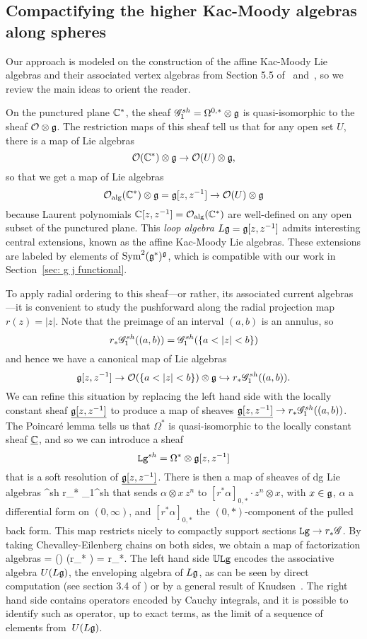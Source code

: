 \subsection{Compactifying the higher Kac-Moody algebras along spheres}

Our approach is modeled on the construction of the affine Kac-Moody Lie algebras and their associated vertex algebras from Section 5.5 of~\cite{CG1} and~\cite{OGthesis},
so we review the main ideas to orient the reader.

On the punctured plane $\mathbb C^*$, the sheaf $
\mathscr G_1^{sh} = \Omega^{0,*} \otimes \mathfrak g$ is quasi-isomorphic to the sheaf $\mathcal O \otimes \mathfrak g$.
The restriction maps of this sheaf tell us that for any open set $U$, there is a map of Lie algebras
\[
\mathcal O(\mathbb C^*) \otimes \mathfrak g \to \mathcal O(U) \otimes \mathfrak g,
\]
so that we get a map of Lie algebras
\[
\mathcal O_{\rm alg}(\mathbb C^*) \otimes \mathfrak g = \mathfrak g[z,z^{-1}] \to  \mathcal O(U) \otimes \mathfrak g
\]
because Laurent polynomials $\mathbb C[z,z^{-1}] = \mathcal O_{\rm alg}(\mathbb C^*)$ are well-defined on any open subset of the punctured plane.
This {\em loop algebra} $L\mathfrak g = \mathfrak g[z,z^{-1}]$ admits interesting central extensions,
known as the affine Kac-Moody Lie algebras.
These extensions are labeled by elements of ${\rm Sym}^2(\mathfrak g^*)^\mathfrak g$, 
which is compatible with our work in Section~\ref{sec: g j functional}.

To apply radial ordering to this sheaf---or rather, its associated current algebras---it is convenient to study the pushforward along the radial projection map $r(z) = |z|$.
Note that the preimage of an interval $(a,b)$ is an annulus, so
\[
r_* \mathscr G_1^{sh}((a,b)) = \mathscr G_1^{sh}(\{a < |z| < b\})
\]
and hence we have a canonical map of Lie algebras
\[
\mathfrak g[z,z^{-1}] \to \mathcal O(\{a < |z| < b\}) \otimes \mathfrak g \hookrightarrow r_* \mathscr G_1^{sh}((a,b)).
\]
We can refine this situation by replacing the left hand side with the locally constant sheaf $\underline{\mathfrak g[z,z^{-1}]}$ to produce a map of sheaves $\underline{\mathfrak g[z,z^{-1}]} \to  r_* \mathscr G_1^{sh}((a,b))$.
The Poincar\'e lemma tells us that $\Omega^*$ is quasi-isomorphic to the locally constant sheaf $\underline{\mathbb C}$,
and so we can introduce a sheaf
\[
\mathtt{Lg}^{sh} = \Omega^* \otimes \mathfrak g[z,z^{-1}]
\]
that is a soft resolution of $\underline{\mathfrak g[z,z^{-1}]}$.
There is then a map of sheaves of dg Lie algebras
\beqn
\label{eqn:looptolinearcurrent}
^{sh} \to r_* \sG_1^{sh}
\eeqn
that sends $\alpha \otimes x\, z^n$ to $[r^*\alpha]_{0,*} \cdot z^n \otimes x$, with $x \in \mathfrak g$, $\alpha$ a differential form on $(0,\infty)$, and $[r^*\alpha]_{0,*}$ the $(0,*)$-component of the pulled back form.
This map restricts nicely to compactly support sections $\mathtt{Lg} \to r_* \mathscr G$.
By taking Chevalley-Eilenberg chains on both sides, we obtain a map of factorization algebras
\beqn
\label{eqn:Uoflooptolinearcurrent}
\UU{} = \cliels() \to \cliels(r_* \sG) = r_*\UU\sG.
\eeqn
The left hand side $\mathbb U\mathtt{Lg}$ encodes the associative algebra $U(L\mathfrak g)$, the enveloping algebra of $L\mathfrak g$,
as can be seen by direct computation (see section 3.4 of \cite{CG1}) or by a general result of Knudsen~\cite{Knudsen}.
The right hand side contains operators encoded by Cauchy integrals, 
and it is possible to identify such as operator, up to exact terms, as the limit of a sequence of elements from~$U(L\mathfrak g)$.

